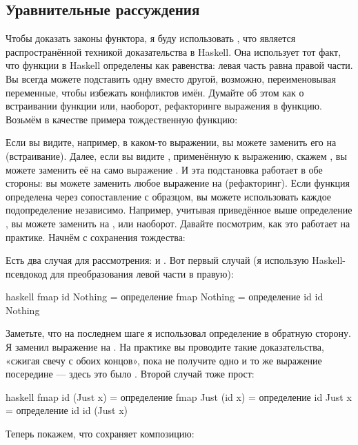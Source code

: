 \subsection{Уравнительные рассуждения}

Чтобы доказать законы функтора, я буду использовать , что является распространённой техникой доказательства в Haskell. Она использует тот факт, что функции в Haskell определены как равенства: левая часть равна правой части. Вы всегда можете подставить одну вместо другой, возможно, переименовывая переменные, чтобы избежать конфликтов имён. Думайте об этом как о встраивании функции или, наоборот, рефакторинге выражения в функцию. Возьмём в качестве примера тождественную функцию:

Если вы видите, например,  в каком-то выражении, вы можете заменить его на  (встраивание). Далее, если вы видите , применённую к выражению, скажем , вы можете заменить её на само выражение . И эта подстановка работает в обе стороны: вы можете заменить любое выражение  на  (рефакторинг). Если функция определена через сопоставление с образцом, вы можете использовать каждое подопределение независимо. Например, учитывая приведённое выше определение , вы можете заменить  на , или наоборот. Давайте посмотрим, как это работает на практике. Начнём с сохранения тождества:

Есть два случая для рассмотрения:  и . Вот первый случай (я использую Haskell-псевдокод для преобразования левой части в правую):

\begin{snip}{haskell}
  fmap id Nothing
= { определение fmap }
  Nothing
= { определение id }
  id Nothing
\end{snip}
Заметьте, что на последнем шаге я использовал определение  в обратную сторону. Я заменил выражение  на . На практике вы проводите такие доказательства, «сжигая свечу с обоих концов», пока не получите одно и то же выражение посередине — здесь это было . Второй случай тоже прост:

\begin{snip}{haskell}
  fmap id (Just x)
= { определение fmap }
  Just (id x)
= { определение id }
  Just x
= { определение id }
  id (Just x)
\end{snip}
Теперь покажем, что  сохраняет композицию:

